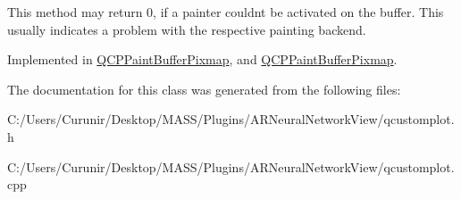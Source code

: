 This method may return 0, if a painter couldn\textquotesingle{}t be activated on the buffer. This usually indicates a problem with the respective painting backend. 

Implemented in \hyperlink{class_q_c_p_paint_buffer_pixmap_a357964ef7d28cfa530338be4e5c93234}{Q\+C\+P\+Paint\+Buffer\+Pixmap}, and \hyperlink{class_q_c_p_paint_buffer_pixmap_a0b919d080c2551ee35aedccebde0a67d}{Q\+C\+P\+Paint\+Buffer\+Pixmap}.



The documentation for this class was generated from the following files\+:\begin{DoxyCompactItemize}
\item 
C\+:/\+Users/\+Curunir/\+Desktop/\+M\+A\+S\+S/\+Plugins/\+A\+R\+Neural\+Network\+View/qcustomplot.\+h\item 
C\+:/\+Users/\+Curunir/\+Desktop/\+M\+A\+S\+S/\+Plugins/\+A\+R\+Neural\+Network\+View/qcustomplot.\+cpp\end{DoxyCompactItemize}
